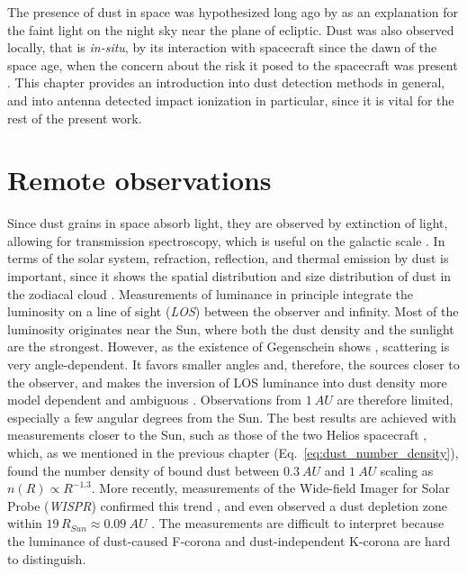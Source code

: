 The presence of dust in space was hypothesized long ago by \citet{cassini1685} as an explanation for the faint light on the night sky near the plane of ecliptic. Dust was also observed locally, that is \textit{in-situ}, by its interaction with spacecraft since the dawn of the space age, when the concern about the risk it posed to the spacecraft was present \citep{whipple1958meteoritic}. This chapter provides an introduction into dust detection methods in general, and into antenna detected impact ionization in particular, since it is vital for the rest of the present work.

\section{Remote observations}

Since dust grains in space absorb light, they are observed by extinction of light, \citep{desert1990interstellar} allowing for transmission spectroscopy, which is useful on the galactic scale \citep{mann2010interstellar}. In terms of the solar system, refraction, reflection, and thermal emission by dust is important, since it shows the spatial distribution and size distribution of dust in the zodiacal cloud \citep{allen1946spectrum,hulst1947zodiacal,leinert1981zodiacal,stenborg2018characterization,stenborg2021psp}. Measurements of luminance in principle integrate the luminosity on a line of sight (\textit{LOS}) between the observer and infinity. Most of the luminosity originates near the Sun, where both the dust density and the sunlight are the strongest. However, as the existence of Gegenschein shows \citep{roosen1971gegenschein}, scattering is very angle-dependent. It favors smaller angles and, therefore, the sources closer to the observer, and makes the inversion of LOS luminance into dust density more model dependent and ambiguous \citep{mann2004dust,kneissel1991spatial}. Observations from $\SI{1}{AU}$ are therefore limited, especially a few angular degrees from the Sun. The best results are achieved with measurements closer to the Sun, such as those of the two Helios spacecraft \citep{leinert1981zodiacal}, which, as we mentioned in the previous chapter (Eq.~\ref{eq:dust_number_density}), found the number density of bound dust between $\SI{0.3}{AU}$ and $\SI{1}{AU}$ scaling as $n(R) \propto R^{-1.3}$. More recently, measurements of the Wide-field Imager for Solar Probe (\textit{WISPR}) confirmed this trend \citep{stenborg2021psp}, and even observed a dust depletion zone within $19 \, R_{Sun} \approx \SI{0.09}{AU}$ \citep{stenborg2022psp}. The measurements are difficult to interpret because the luminance of dust-caused F-corona and dust-independent K-corona are hard to distinguish. 

